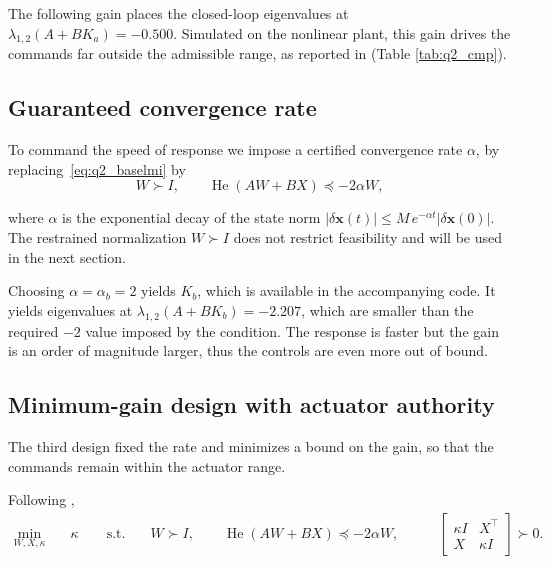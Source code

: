 \documentclass[10pt,a4paper]{scrartcl}
\begin{document}
The following gain places the closed-loop eigenvalues at $\lambda_{1,2}(A+BK_a)=-0.500$. Simulated on the nonlinear plant, this gain drives the commands far outside the admissible range, as reported in (Table \ref{tab:q2_cmp}).


\subsection{Guaranteed convergence rate}
To command the speed of response we impose a certified convergence rate $\alpha$, by replacing~\eqref{eq:q2_baselmi} by \citep[eq.~(26)]{zaccarian_lmi}
\begin{equation}
    W\succ I,\qquad \operatorname{He}(AW+BX)\preceq-2\alpha W ,
    \label{eq:q2_lmi_b}
\end{equation}

where $\alpha$ is the exponential decay of the state norm $|\delta\bm{x}(t)|\le M\,e^{-\alpha t}|\delta\bm{x}(0)|$. The restrained normalization $W \succ I$ does not restrict feasibility and will be used in the next section.

Choosing $\alpha = \alpha_b = 2$ yields $K_b$, which is available in the accompanying code. It yields eigenvalues at $\lambda_{1,2}(A+BK_b)=-2.207$, which are smaller than the required $-2$ value imposed by the condition. The response is faster but the gain is an order of magnitude larger, thus the controls are even more out of bound. 

\subsection{Minimum-gain design with actuator authority}

The third design fixed the rate and minimizes a bound on the gain, so that the commands remain within the actuator range. 


Following
\citep[eq.~(27)]{zaccarian_lmi},
\begin{equation}
    \begin{aligned}
        \min_{W,X,\kappa}\quad & \kappa \qquad
        \text{s.t.}\quad & W\succ I,\qquad
            \operatorname{He}(AW+BX)\preceq-2\alpha W, \qquad
        & \begin{bmatrix} \kappa I & X^\top\\ X & \kappa I \end{bmatrix}\succ0 .
    \end{aligned}
    \label{eq:q2_lmi_c}
\end{equation}
\end{document}
